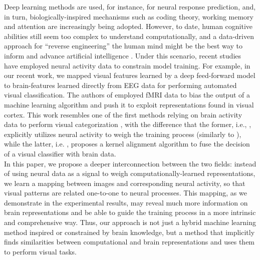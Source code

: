 \documentclass[10pt,journal,compsoc,twocolumn]{IEEEtran}
\begin{document}
Deep learning methods are used, for instance, for neural response prediction\cite{NIPS2013_4991,pmid24812127,pmid19104670}, and, in turn, biologically-inspired mechanisms such as coding theory\cite{pmlr-v80-wen18a}, working memory\cite{pmid27732574} and attention \cite{pmlr-v37-gregor15,pmlr-v37-xuc15} are increasingly being adopted.
However, to date, human cognitive abilities still seem too complex to understand computationally, and a data-driven approach for ``reverse engineering'' the human mind might be the best way to inform and advance artificial intelligence \cite{pmid27881212}. Under this scenario, recent studies have employed neural activity data to constrain model training. For example, in our recent work\cite{Spampinato2016deep}, we mapped visual features learned by a deep feed-forward model to brain-features learned directly from EEG data for performing automated visual classification. The authors of \cite{pmid29599461} employed fMRI data to bias the output of a machine learning algorithm and push it to exploit representations found in visual cortex. This work resembles one of the first methods relying on brain activity data to perform visual categorization \cite{4587618}, with the difference that the former, i.e., \cite{pmid29599461}, explicitly utilizes neural activity to weigh the training process (similarly to \cite{pmid26353347}), while the latter, i.e. \cite{4587618}, proposes a kernel alignment algorithm to fuse the decision of a visual classifier with brain data.\\ 
In this paper, we propose a deeper interconnection between the two fields: instead of using neural data as a signal to weigh computationally-learned representations, we learn a mapping between images and corresponding neural activity, so that visual patterns are related one-to-one to neural processes. This mapping, as we demonstrate in the experimental results, may reveal much more information on brain representations and be able to guide the training process in a more intrinsic and comprehensive way. Thus, our approach is not just a hybrid machine learning method inspired or constrained by brain knowledge, but a method that implicitly finds similarities between computational and brain representations and uses them to perform visual tasks.\\
\\
\end{document}
